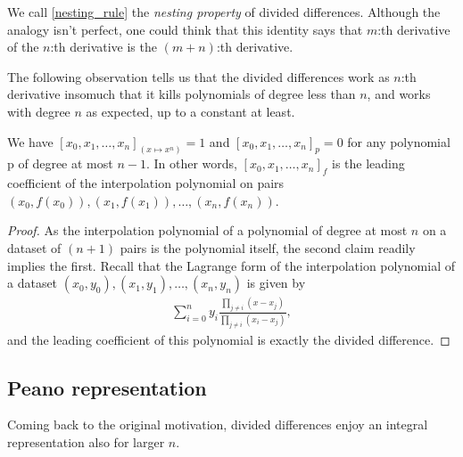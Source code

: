 We call \ref{nesting_rule} the \textit{nesting property} of divided differences. Although the analogy isn't perfect, one could think that this identity says that $m$:th derivative of the $n$:th derivative is the $(m + n)$:th derivative. 

The following observation tells us that the divided differences work as $n$:th derivative insomuch that it kills polynomials of degree less than $n$, and works with degree $n$ as expected, up to a constant at least.

\begin{prop}\label{lagrange_divided}
We have $[x_{0}, x_{1}, \ldots, x_{n}]_{(x \mapsto x^{n})} = 1$ and $[x_{0}, x_{1}, \ldots, x_{n}]_{p} = 0$ for any polynomial p of degree at most $n - 1$. In other words, $[x_{0}, x_{1}, \ldots, x_{n}]_{f}$ is the leading coefficient of the interpolation polynomial on pairs $(x_{0}, f(x_{0})), (x_{1}, f(x_{1})), \ldots, (x_{n}, f(x_{n}))$.
\end{prop}
\begin{proof}
	As the interpolation polynomial of a polynomial of degree at most $n$ on a dataset of $(n + 1)$ pairs is the polynomial itself, the second claim readily implies the first. Recall that the Lagrange form of the interpolation polynomial of a dataset $(x_{0}, y_{0}), (x_{1}, y_{1}), \ldots, (x_{n}, y_{n})$ is given by
	\begin{align*}
		\sum_{i = 0}^{n} y_{i} \frac{\prod_{j \neq i}(x - x_{j})}{\prod_{j \neq i}(x_{i} - x_{j})},
	\end{align*}
	and the leading coefficient of this polynomial is exactly the divided difference.
\end{proof}

\subsection{Peano representation}

Coming back to the original motivation, divided differences enjoy an integral representation also for larger $n$.

